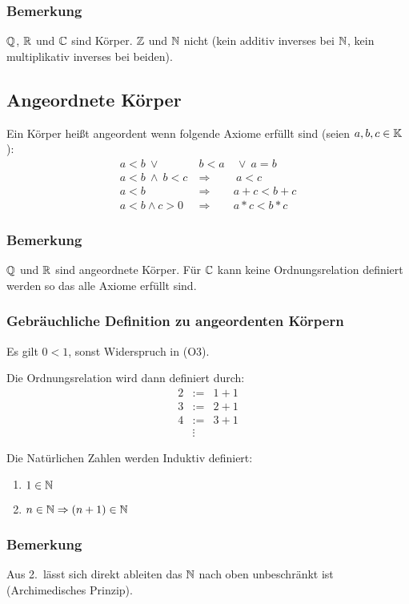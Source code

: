 \subsubsection{Bemerkung}
$\mathbb{Q}$, $\mathbb{R}$ und $\mathbb{C}$ sind Körper.
$\mathbb{Z}$ und $\mathbb{N}$ nicht (kein additiv inverses bei $\mathbb{N}$,
kein multiplikativ inverses bei beiden).


\subsection{Angeordnete Körper}
Ein Körper heißt angeordent wenn folgende Axiome erfüllt sind
(seien $a,b,c \in \mathbb{K}$):
\begin{eqnarray*}
    a<b\ \lor\ &b<a&\ \lor\ a=b\\
    a<b\ \land\ b<c\ &\Rightarrow&\ a<c\\
    a<b &\Rightarrow& a+c<b+c\\
    a<b \land c>0 &\Rightarrow& a*c<b*c
\end{eqnarray*}
\subsubsection{Bemerkung}
$\mathbb{Q}$ und $\mathbb{R}$ sind angeordnete Körper. Für $\mathbb{C}$
kann keine Ordnungsrelation definiert werden so das alle Axiome erfüllt
sind.

\subsubsection{Gebräuchliche Definition zu angeordenten Körpern}
Es gilt $0<1$, sonst Widerspruch in (O3).

 Die Ordnungsrelation wird dann definiert durch:
\begin{eqnarray*}
    2&:=& 1+1 \\
    3&:=& 2+1 \\
    4&:=&3+1 \\
    &\vdots&
\end{eqnarray*}

 Die Natürlichen Zahlen werden Induktiv definiert:
\begin{enumerate}
    \item $1 \in \mathbb{N}$
    \item $n \in \mathbb{N} \Rightarrow (n+1)\in\mathbb{N}$
\end{enumerate}

\subsubsection{Bemerkung}
Aus 2.\ lässt sich direkt ableiten das $\mathbb{N}$ nach oben unbeschränkt ist (Archimedisches Prinzip).

